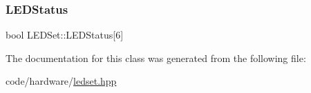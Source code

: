 \mbox{\label{classLEDSet_a54945652a2ba428b70ad620e88b4ab60}} 
\subsubsection{\texorpdfstring{L\+E\+D\+Status}{LEDStatus}}
{\footnotesize\ttfamily bool L\+E\+D\+Set\+::\+L\+E\+D\+Status\mbox{[}6\mbox{]}}



The documentation for this class was generated from the following file\+:\begin{DoxyCompactItemize}
\item 
code/hardware/\hyperlink{ledset_8hpp}{ledset.\+hpp}\end{DoxyCompactItemize}
